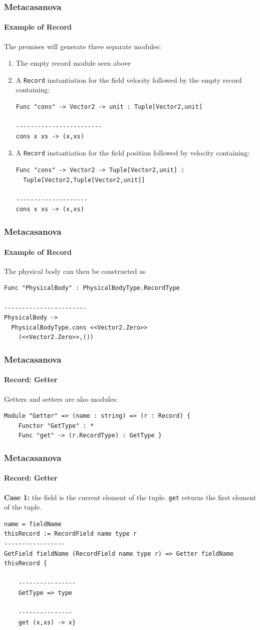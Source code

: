 \documentclass[10pt,a4paper]{beamer}
\begin{document}
\begin{frame}[fragile]
\frametitle{Metacasanova}
\framesubtitle{Example of Record}
The premises will generate three separate modules:

\begin{enumerate}
	\item The empty record module seen above
	\item A \texttt{Record} instantiation for the field velocity followed by the empty record containing:
	\begin{lstlisting}
Func "cons" -> Vector2 -> unit : Tuple[Vector2,unit]

------------------------
cons x xs -> (x,xs)
	\end{lstlisting}
	\item A \texttt{Record} instantiation for the field position followed by velocity containing:
	\begin{lstlisting}
Func "cons" -> Vector2 -> Tuple[Vector2,unit] : 
  Tuple[Vector2,Tuple[Vector2,unit]]

--------------------
cons x xs -> (x,xs)
	\end{lstlisting}
\end{enumerate}

\end{frame}

\begin{frame}[fragile]
\frametitle{Metacasanova}
\framesubtitle{Example of Record}

The physical body can then be constructed as

\begin{lstlisting}
Func "PhysicalBody" : PhysicalBodyType.RecordType

-----------------------
PhysicalBody -> 
  PhysicalBodyType.cons <<Vector2.Zero>> 
    (<<Vector2.Zero>>,())
\end{lstlisting}
\end{frame}

\begin{frame}[fragile]
\frametitle{Metacasanova}
\framesubtitle{Record: Getter}

Getters and setters are also modules:
\begin{lstlisting}
Module "Getter" => (name : string) => (r : Record) {
	Functor "GetType" : *
	Func "get" -> (r.RecordType) : GetType }
\end{lstlisting}
\end{frame}

\begin{frame}[fragile]
\frametitle{Metacasanova}
\framesubtitle{Record: Getter}

\textbf{Case 1:} the field is the current element of the tuple. \texttt{get} returns the first element of the tuple.

\begin{lstlisting}
name = fieldName
thisRecord := RecordField name type r
-----------------
GetField fieldName (RecordField name type r) => Getter fieldName thisRecord {

	----------------
	GetType => type
	
	---------------
	get (x,xs) -> x}
\end{lstlisting}
\end{frame}
\end{document}
